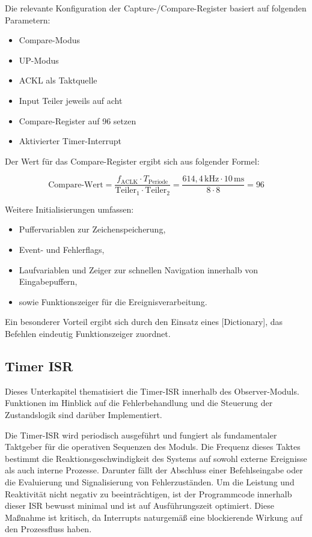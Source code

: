 Die relevante Konfiguration der Capture-/Compare-Register basiert auf folgenden Parametern:

\begin{itemize}
	\item Compare-Modus
	\item UP-Modus
	\item ACKL als Taktquelle
	\item Input Teiler jeweils auf acht
	\item Compare-Register auf 96 setzen
	\item Aktivierter Timer-Interrupt
\end{itemize}

Der Wert f\"ur das Compare-Register ergibt sich aus folgender Formel:

\[
\text{Compare-Wert} = \frac{f_\text{ACLK} \cdot T_\text{Periode}}{\text{Teiler}_1 \cdot \text{Teiler}_2} = \frac{614{,}4\,\text{kHz} \cdot 10\,\text{ms}}{8 \cdot 8} = 96
\]

Weitere Initialisierungen umfassen:
\begin{itemize}
	\item Puffervariablen zur Zeichenspeicherung,
	\item Event- und Fehlerflags,
	\item Laufvariablen und Zeiger zur schnellen Navigation innerhalb von Eingabepuffern,
	\item sowie Funktionszeiger f\"ur die Ereignisverarbeitung.
\end{itemize}

Ein besonderer Vorteil ergibt sich durch den Einsatz eines [Dictionary], das Befehlen eindeutig Funktionszeiger zuordnet.

\newpage
\subsection{Timer ISR}
\label{Timer_ISR}

Dieses Unterkapitel thematisiert die Timer-ISR innerhalb des Observer-Moduls. Funktionen im Hinblick auf die Fehlerbehandlung und die Steuerung der Zustandslogik sind dar\"uber Implementiert.

Die Timer-ISR wird periodisch ausgef\"uhrt und fungiert als fundamentaler Taktgeber f\"ur die operativen Sequenzen des Moduls. Die Frequenz dieses Taktes bestimmt die Reaktionsgeschwindigkeit des Systems auf sowohl externe Ereignisse als auch interne Prozesse. Darunter f\"allt der Abschluss einer Befehlseingabe oder die Evaluierung und Signalisierung von Fehlerzust\"anden. Um die Leistung und Reaktivit\"at nicht negativ zu beeintr\"achtigen, ist der Programmcode innerhalb dieser ISR bewusst minimal und ist auf Ausf\"uhrungszeit optimiert. Diese Ma{\ss}nahme ist kritisch, da Interrupts naturgem\"a{\ss} eine blockierende Wirkung auf den Prozessfluss haben.


